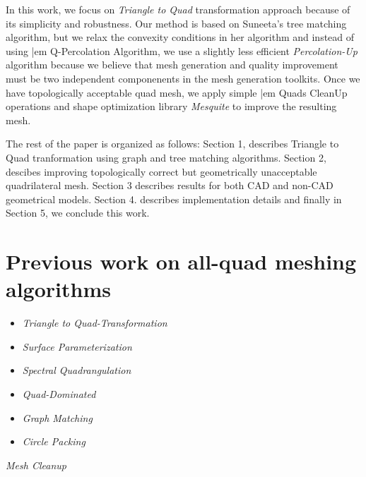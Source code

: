 \documentclass[11pt, a4paper]{paper}
\begin{document}
In this work, we focus on {\em Triangle to Quad} transformation approach because 
of its simplicity and robustness. Our method is based on Suneeta's tree
matching algorithm, but we relax the convexity conditions in her algorithm and
instead of using {|em Q-Percolation Algorithm}, we use a slightly less
efficient {\em Percolation-Up } algorithm because we believe that mesh
generation and quality improvement must be two independent componenents in the
mesh generation toolkits. Once we have topologically acceptable quad mesh,
we apply simple {|em Quads CleanUp } operations and shape optimization library
{\em Mesquite} to improve the resulting mesh.

The rest of the paper is organized as follows: Section 1, describes Triangle to Quad tranformation using graph and tree matching algorithms. Section 2, descibes improving topologically correct but geometrically unacceptable quadrilateral mesh. Section 3 describes results for both CAD and non-CAD geometrical models.
Section 4. describes implementation details and finally in Section 5, we conclude this work.

\section {Previous work on all-quad meshing algorithms}


\begin{itemize}
\item {\em Triangle to Quad-Transformation}
\item {\em Surface Parameterization }
\item {\em Spectral Quadrangulation }
\item {\em Quad-Dominated }
\item {\em Graph Matching }
\item {\em Circle Packing }
\end {itemize}

{\em Mesh Cleanup}

\end{document}
